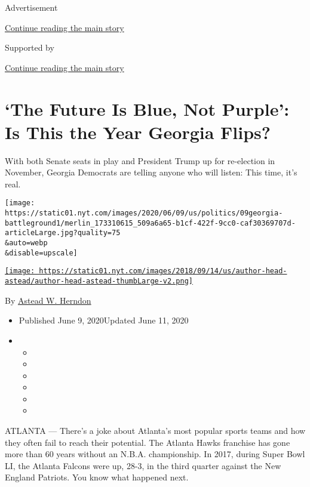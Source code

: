 Advertisement

\protect\hyperlink{after-top}{Continue reading the main story}

Supported by

\protect\hyperlink{after-sponsor}{Continue reading the main story}

\hypertarget{the-future-is-blue-not-purple-is-this-the-year-georgia-flips}{%
\section{`The Future Is Blue, Not Purple': Is This the Year Georgia
Flips?}\label{the-future-is-blue-not-purple-is-this-the-year-georgia-flips}}

With both Senate seats in play and President Trump up for re-election in
November, Georgia Democrats are telling anyone who will listen: This
time, it's real.

\texttt{[image: https://static01.nyt.com/images/2020/06/09/us/politics/09georgia-battleground1/merlin\_173310615\_509a6a65-b1cf-422f-9cc0-caf30369707d-articleLarge.jpg?quality=75\\\&auto=webp\\\&disable=upscale]}

\href{https://www.nytimes.com/by/astead-w-herndon}{\texttt{[image: https://static01.nyt.com/images/2018/09/14/us/author-head-astead/author-head-astead-thumbLarge-v2.png]}}

By \href{https://www.nytimes.com/by/astead-w-herndon}{Astead W. Herndon}

\begin{itemize}
\item
  Published June 9, 2020Updated June 11, 2020
\item
  \begin{itemize}
  \item
  \item
  \item
  \item
  \item
  \item
  \end{itemize}
\end{itemize}

ATLANTA --- There's a joke about Atlanta's most popular sports teams and
how they often fail to reach their potential. The Atlanta Hawks
franchise has gone more than 60 years without an N.B.A. championship. In
2017, during Super Bowl LI, the Atlanta Falcons were up, 28-3, in the
third quarter against the New England Patriots. You know what happened
next.

